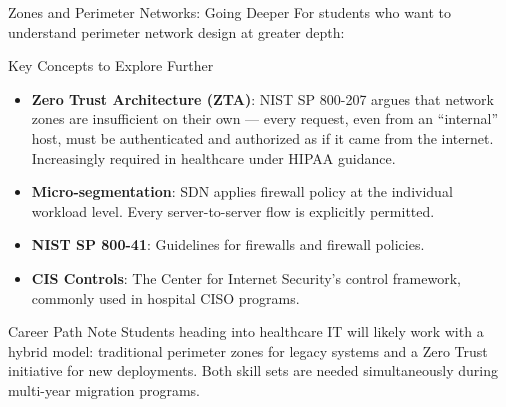 \documentclass[aspectratio=169]{beamer}  %
\begin{document}

\begin{frame}{Zones and Perimeter Networks: Going Deeper}
    \footnotesize
    For students who want to understand perimeter network design at greater depth:

    \vspace{0.3em}
    \begin{block}{Key Concepts to Explore Further}
        \footnotesize
        \begin{itemize}
            \item \textbf{Zero Trust Architecture (ZTA)}: NIST SP 800-207 argues that network zones are insufficient on their own --- every request, even from an ``internal'' host, must be authenticated and authorized as if it came from the internet. Increasingly required in healthcare under HIPAA guidance.
            \item \textbf{Micro-segmentation}: SDN applies firewall policy at the individual workload level. Every server-to-server flow is explicitly permitted.
            \item \textbf{NIST SP 800-41}: Guidelines for firewalls and firewall policies.
            \item \textbf{CIS Controls}: The Center for Internet Security's control framework, commonly used in hospital CISO programs.
        \end{itemize}
    \end{block}

    \begin{exampleblock}{Career Path Note}
        \footnotesize
        Students heading into healthcare IT will likely work with a hybrid model: traditional perimeter zones for legacy systems and a Zero Trust initiative for new deployments. Both skill sets are needed simultaneously during multi-year migration programs.
    \end{exampleblock}
\end{frame}
\end{document}
